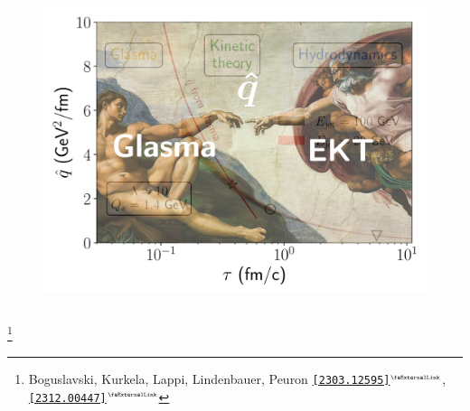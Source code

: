\documentclass[aspectratio=169,11pt,usenames,dvipsnames]{beamer}
\renewcommand{\thefootnote}{\color{customblue}\faPaperPlaneO}
\newcommand\blfootnote[1]{%
  \begingroup
  \renewcommand\thefootnote{}\footnote{#1}%
  \addtocounter{footnote}{-1}%
  \endgroup
}
\begin{document}
\begin{frame}[noframenumbering]
\begin{columns}[onlytextwidth,t]
\begin{figure}[!hbt]
            \includegraphics[width=0.8\columnwidth]{images/qhat_glasma_ekt.png}
        \end{figure}
    \end{columns}   
    \blfootnote{\scriptsize Boguslavski, Kurkela, Lappi, Lindenbauer, Peuron \href{https://arxiv.org/abs/2303.12595}{{\color{ForestGreen}\texttt{[2303.12595]}$^\text{\tiny\faExternalLink}$}}, \href{https://arxiv.org/abs/2312.00447}{{\color{ForestGreen}\texttt{[2312.00447]}$^\text{\tiny\faExternalLink}$}}}
\end{frame}




\end{document}
